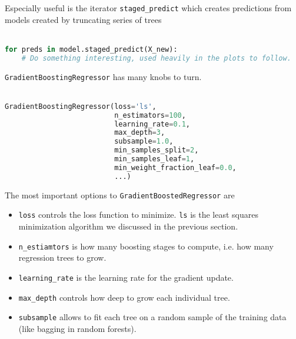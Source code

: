 \begin{frame}[fragile]
Especially useful is the iterator \texttt{staged\_predict} which creates predictions from models created by truncating series of trees\\~\\

\begin{lstlisting}[language=python]
for preds in model.staged_predict(X_new):
    # Do something interesting, used heavily in the plots to follow.
\end{lstlisting}

\end{frame}
%
\begin{frame}[fragile]

\texttt{GradientBoostingRegressor} has many knobs to turn.\\~\\

\begin{lstlisting}[language=python]
GradientBoostingRegressor(loss='ls',
                          n_estimators=100, 
                          learning_rate=0.1,
                          max_depth=3,
                          subsample=1.0, 
                          min_samples_split=2, 
                          min_samples_leaf=1, 
                          min_weight_fraction_leaf=0.0,
                          ...)
\end{lstlisting}

\end{frame}
%
\begin{frame}[fragile]
The most important options to \texttt{GradientBoostedRegressor} are

\begin{itemize}
  \item \texttt{loss} controls the loss function to minimize.  \texttt{ls} is the least squares minimization algorithm we discussed in the previous section.
  \item \texttt{n\_estiamtors} is how many boosting stages to compute, i.e. how many regression trees to grow.
  \item \texttt{learning\_rate} is the learning rate for the gradient update.
  \item \texttt{max\_depth} controls how deep to grow each individual tree.
  \item \texttt{subsample} allows to fit each tree on a random sample of the training data (like bagging in random forests).
\end{itemize}

\end{frame}
